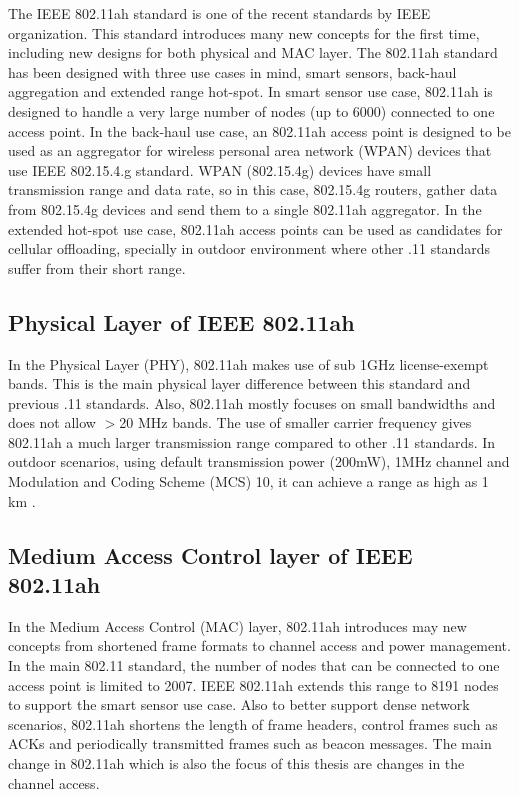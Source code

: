  The IEEE 802.11ah standard is one of the recent standards by IEEE organization. This standard introduces many new concepts for the first time, including new designs for both physical and MAC layer. The 802.11ah standard has been designed with three use cases in mind, smart sensors, back-haul aggregation and extended range hot-spot. In smart sensor use case, 802.11ah is designed to handle a very large number of nodes (up to 6000) connected to one access point. In the back-haul use case, an 802.11ah access point is designed to be used as an aggregator for wireless personal area network (WPAN) devices that use IEEE 802.15.4.g standard. WPAN (802.15.4g) devices have small transmission range and data rate, so in this case, 802.15.4g routers, gather data from 802.15.4g devices and send them to a single 802.11ah aggregator. In the extended hot-spot use case, 802.11ah access points can be used as candidates for cellular offloading, specially in outdoor environment where other .11 standards suffer from their short range.

\subsection{Physical Layer of IEEE 802.11ah}
In the Physical Layer (PHY), 802.11ah makes use of sub 1GHz license-exempt bands. This is the main physical layer difference between this standard and previous .11 standards. Also, 802.11ah mostly focuses on small bandwidths and does not allow $>$20 MHz bands. The use of smaller carrier frequency gives 802.11ah a much larger transmission range compared to other .11 standards. In outdoor scenarios, using default transmission power (200mW), 1MHz channel and Modulation and Coding Scheme (MCS) 10, it can achieve a range as high as 1 km \cite{khorov2015survey}. 

\subsection{Medium Access Control layer of IEEE 802.11ah}
 In the Medium Access Control (MAC) layer, 802.11ah introduces may new concepts from shortened frame formats to channel access and power management. In the main 802.11 standard, the number of nodes that can be connected to one access point is limited to 2007. IEEE 802.11ah extends this range to 8191 nodes to support the smart sensor use case. Also to better support dense network scenarios, 802.11ah shortens the length of frame headers, control frames such as ACKs and periodically transmitted frames such as beacon messages. The main change in 802.11ah which is also the focus of this thesis are changes in the channel access. 

